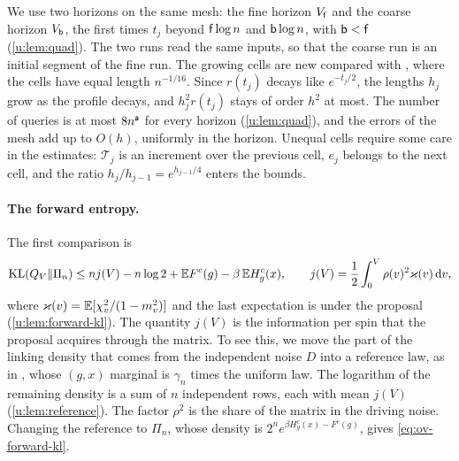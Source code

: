 We use two horizons on the same mesh: the fine horizon $V_{\mathsf{f}}$ and the
coarse horizon $V_{\mathsf{b}}$, the first times $t_j$ beyond $\mathsf{f}\log n$ and
$\mathsf{b}\log n$, with $\mathsf{b}<\mathsf{f}$ (\cref{u:lem:quad}). The two runs read the
same inputs, so that the coarse run is an initial segment of the fine run. The
growing cells are new compared with \cite{oai-typical-upper}, where the cells
have equal length $n^{-1/16}$. Since $r(t_j)$ decays like $e^{-t_j/2}$, the
lengths $h_j$ grow as the profile decays, and $h_j^2r(t_j)$ stays of order
$h^2$ at most. The number of queries is at most $8n^{\mathsf{a}}$ for every horizon
(\cref{u:lem:quad}), and the errors of the mesh add up to $O(h)$, uniformly in
the horizon. Unequal cells require some care in the estimates: $\mathcal T_j$
is an increment over the previous cell, $e_j$ belongs to the next cell, and the
ratio $h_j/h_{j-1}=e^{h_{j-1}/4}$ enters the bounds.

\paragraph{The forward entropy.} The first comparison is
\begin{equation}\label{eq:ov-forward-kl}
 \operatorname{KL}(Q_V\Vert\Pi_n)\le nj(V)-n\log2+\mathbb E F^c(g)-\beta\,\mathbb E H^c_g(x),
 \qquad j(V)=\frac12\int_0^V\rho(v)^2\varkappa(v)\,\mathrm d v,
\end{equation}
where $\varkappa(v)=\mathbb E[\chi_v^2/(1-m_v^2)]$ and the last expectation is under
the proposal (\cref{u:lem:forward-kl}). The quantity $j(V)$ is the
information per spin that the proposal acquires through the matrix. To see
this, we move the part of the linking density that comes from the independent
noise $D$ into a reference law, as in \cite[Section~4]{oai-typical-upper}, whose $(g,x)$ marginal is $\gamma_n$ times the
uniform law. The logarithm of the remaining density is a sum of $n$
independent rows, each with mean $j(V)$ (\cref{u:lem:reference}). The factor
$\rho^2$ is the share of the matrix in the driving noise. Changing the
reference to $\Pi_n$, whose density is $2^ne^{\beta H^c_g(x)-F^c(g)}$, gives
\eqref{eq:ov-forward-kl}.

